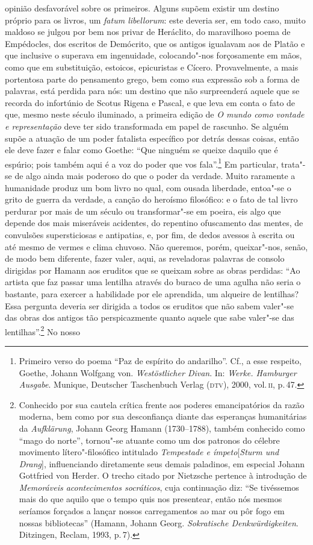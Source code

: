 opinião desfavorável sobre os primeiros. Alguns supõem existir um destino
próprio para os livros, um \textit{fatum libellorum}: este deveria ser, em
todo caso, muito maldoso se julgou por bem nos privar de Heráclito, do
maravilhoso poema de Empédocles, dos escritos de Demócrito, que os antigos
igualavam aos de Platão e que inclusive o superava em ingenuidade,
colocando"-nos forçosamente em mãos, como que em substituição, estoicos,
epicuristas e Cícero. Provavelmente, a mais portentosa parte do pensamento
grego, bem como sua expressão sob a forma de palavras, está perdida para nós:
um destino que não surpreenderá aquele que se recorda do infortúnio de Scotus
Rigena e Pascal, e que leva em conta o fato de que, mesmo neste século
iluminado, a primeira edição de \textit{O mundo como vontade e representação}
deve ter sido transformada em papel de rascunho. Se alguém supõe a atuação de
um poder fatalista específico por detrás dessas coisas, então ele deve fazer
e falar como Goethe: ``Que ninguém se queixe daquilo que é espúrio; pois
também aqui é a voz do poder que vos fala''.\footnote{Primeiro verso do
poema ``Paz de espírito do andarilho''. Cf., a esse respeito, Goethe, Johann
Wolfgang von. \textit{Westöstlicher Divan}. In: \textit{Werke. Hamburger
Ausgabe}. Munique, Deutscher Taschenbuch Verlag (\textsc{dtv}), 2000,
vol.\,\textsc{ii}, p.\,47.} Em particular, trata"-se de algo ainda mais
poderoso do que o poder da verdade. Muito raramente a humanidade produz um
bom livro no qual, com ousada liberdade, entoa"-se o grito de guerra da
verdade, a canção do heroísmo filosófico: e o fato de tal livro perdurar por
mais de um século ou transformar"-se em poeira, eis algo que depende dos mais
miseráveis acidentes, do repentino ofuscamento das mentes, de convulsões
supersticiosas e antipatias, e, por fim, de dedos avessos à escrita ou até
mesmo de vermes e clima chuvoso. Não queremos, porém, queixar"-nos, senão, de
modo bem diferente, fazer valer, aqui, as reveladoras palavras de consolo
dirigidas por Hamann aos eruditos que se queixam sobre as obras perdidas:
``Ao artista que faz passar uma lentilha através do buraco de uma agulha não
seria o bastante, para exercer a habilidade por ele aprendida, um alqueire de
lentilhas? Essa pergunta deveria ser dirigida a todos os eruditos que não
sabem valer"-se das obras dos antigos tão perspicazmente quanto aquele que
sabe valer"-se das lentilhas''.\footnote{Conhecido por sua cautela crítica
frente aos poderes emancipatórios da razão moderna, bem como por sua
desconfiança diante das esperanças humanitárias da \textit{Aufklärung}, 
Johann Georg Hamann (1730--1788), também conhecido como ``mago do norte'', 
tornou"-se atuante como um dos patronos do célebre movimento lítero"-filosófico 
intitulado \textit{Tempestade e ímpeto}[\textit{Sturm und Drang}], 
influenciando diretamente seus demais paladinos, em especial Johann 
Gottfried von Herder. O trecho citado por Nietzsche pertence
 à introdução de \textit{Memoráveis acontecimentos socráticos}, cuja
 continuação diz: ``Se tivéssemos mais do que aquilo que o tempo quis nos
 presentear, então nós mesmos seríamos forçados a lançar nossos carregamentos
 ao mar ou pôr fogo em nossas bibliotecas'' (Hamann, Johann Georg. 
 \textit{Sokratische Denkwürdigkeiten}. Ditzingen, Reclam, 1993, p.\,7).} No nosso
